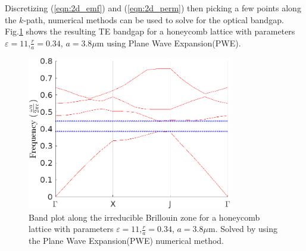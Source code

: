 Discretizing  (\ref{eqn:2d_emf}) and (\ref{eqn:2d_perm}) then picking a few points along the $k$-path, numerical methods can be used to solve for the optical bandgap. Fig.\ref{fig:2dbp} shows the resulting TE bandgap for a honeycomb lattice with parameters $\varepsilon=11$,$\frac{r}{a}=0.34$, $a=3.8\mu$m using Plane Wave Expansion(PWE)\cite{sukhoivanov}.
\begin{figure}[h]
	\centering
	\includegraphics[width=0.8\textwidth]{./Figures/HCPCF/2D_BandDiagram.png}
	\caption {Band plot along the irreducible Brillouin zone for a honeycomb lattice with parameters $\varepsilon=11$,$\frac{r}{a}=0.34$, $a=3.8\mu$m. Solved by using the Plane Wave Expansion(PWE) numerical method.}
	\label{fig:2dbp}
\end{figure}
\clearpage
